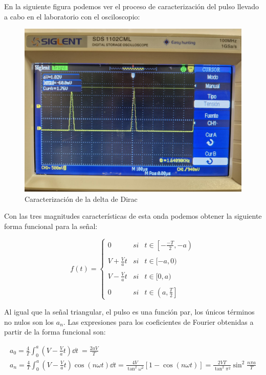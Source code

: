 \documentclass[a4paper,12pt,titlepage]{article}
\begin{document}
En la siguiente figura podemos ver el proceso de caracterización del pulso llevado a cabo en el laboratorio con el osciloscopio:

\newpage

\begin{figure}[h!]
    \centering
    \includegraphics[width=0.5\linewidth]{fourier/delta_dirac/caracterizacion_delta.jpg}
    \caption{Caracterización de la delta de Dirac}
    \label{fig:enter-label}
\end{figure}

Con las tres magnitudes características de esta onda podemos obtener la siguiente forma funcional para la señal:

\begin{equation}
    f(t) = \left\{ \begin{array}{ccc}
        0 & si & t\in \left[-\frac{-T}{2},-a\right) \\ \\
        V + \frac{V}{a}t & si & t\in[-a,0) \\ \\
        V - \frac{V}{a}t & si & t\in[0,a) \\ \\
        0 & si & t\in \left(a,\frac{T}{2}\right]
    \end{array} \right.
\end{equation}

Al igual que la señal triangular, el pulso es una función par, los únicos términos no nulos son los $a_n$. Las expresiones para los coeficientes de Fourier obtenidas a partir de la forma funcional son:

\begin{equation}
    \begin{gathered}
        a_0 = \frac{4}{T} \int_0^a \left( V - \frac{V}{a}t\right) \dd t\ = \frac{2aV}{T} \\
        a_n =  \frac{4}{T} \int_0^a \left( V - \frac{V}{a}t\right) \cos (n\omega t) \dd t = \frac{4V}{\tan^2 \omega^2} [1- \cos (n\omega t)] = \frac{2VT}{\tan^2\pi^2} \sin^2 \frac{n\pi a}{T}
    \end{gathered}
    \label{an delta}
\end{equation}
\end{document}
